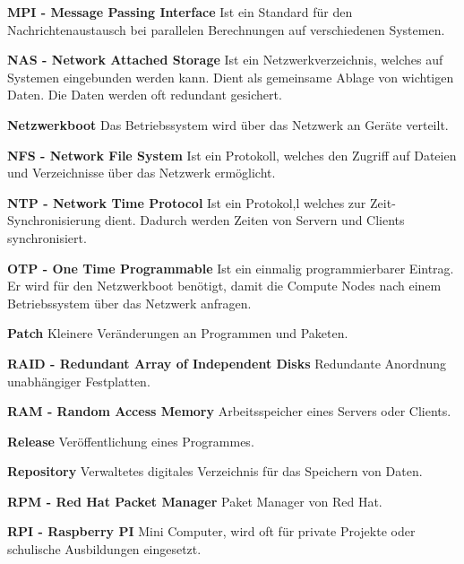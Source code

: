 \textbf{MPI - Message Passing Interface}\newline
Ist ein Standard für den Nachrichtenaustausch bei parallelen Berechnungen auf verschiedenen Systemen. 

\textbf{NAS - Network Attached Storage}\newline
Ist ein Netzwerkverzeichnis, welches auf Systemen eingebunden werden kann. Dient als gemeinsame Ablage von wichtigen Daten. Die Daten werden oft redundant gesichert. 

\textbf{Netzwerkboot}\newline
Das Betriebssystem wird über das Netzwerk an Geräte verteilt.

\textbf{NFS - Network File System}\newline
Ist ein Protokoll, welches den Zugriff auf Dateien und Verzeichnisse über das Netzwerk ermöglicht.

\textbf{NTP - Network Time Protocol}\newline
Ist ein Protokol,l welches zur Zeit-Synchronisierung dient. Dadurch werden Zeiten von Servern und Clients synchronisiert.

\textbf{OTP - One Time Programmable}\newline
Ist ein einmalig programmierbarer Eintrag. Er wird für den Netzwerkboot benötigt, damit die Compute Nodes nach einem Betriebssystem über das Netzwerk anfragen.

\textbf{Patch}\newline
Kleinere Veränderungen an Programmen und Paketen.

\textbf{RAID - Redundant Array of Independent Disks}\newline
Redundante Anordnung unabhängiger Festplatten.

\textbf{RAM - Random Access Memory}\newline
Arbeitsspeicher eines Servers oder Clients.

\textbf{Release}\newline
Veröffentlichung eines Programmes.

\textbf{Repository}\newline
Verwaltetes digitales Verzeichnis für das Speichern von Daten.

\textbf{RPM - Red Hat Packet Manager} \newline
Paket Manager von Red Hat.

\textbf{RPI - Raspberry PI}\newline
Mini Computer, wird oft für private Projekte oder schulische Ausbildungen eingesetzt.

